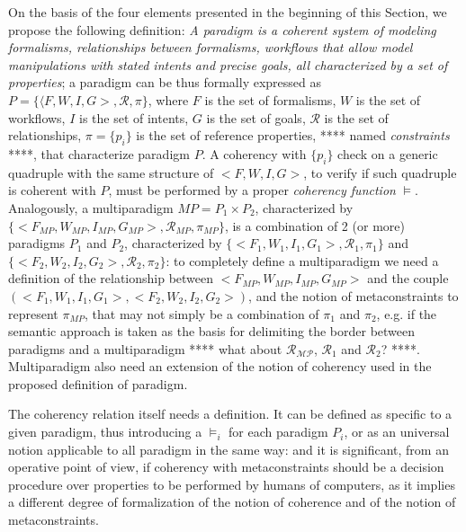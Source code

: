 On the basis of the four elements presented in the beginning of this Section, we propose the following definition: \textit{A paradigm is a coherent system of modeling formalisms, relationships between formalisms, workflows that allow model manipulations with stated intents and precise goals, all characterized by a set of properties}; a paradigm can be thus formally expressed as $P=\{\langle F,W,I,G>, \mathcal{R}, \pi \}$, where $F$ is the set of formalisms, $W$ is the set of workflows, $I$ is the set of intents, $G$ is the set of goals, $\mathcal{R}$ is the set of relationships, $\pi =\{p_i\}$ is the set of reference properties, **** named \textit{constraints} ****, that characterize paradigm $P$. A coherency with $\{p_i\}$ check on a generic quadruple with the same structure of $<F,W,I,G>$, to verify if such quadruple is coherent with $P$, must be performed by a proper \textit{coherency function} $\models$. Analogously, a multiparadigm $MP=P_1 \times P_2$, characterized by $\{<F_\mathit{MP},W_{MP},I_{MP},G_{MP}>, \mathcal{R}_{MP}, \pi_{MP}\}$, is a combination of 2 (or more) paradigms $P_1$ and $P_2$, characterized by $\{< F_1,W_1,I_1,G_1>, \mathcal{R}_1 , \pi_1\}$ and $\{<F_2,W_2,I_2,G_2>, \mathcal{R}_2, \pi_2\}$: to completely define a multiparadigm we need a definition of the relationship between $<F_{MP},W_{MP},I_{MP},G_{MP}>$ and the couple $(< F_1,W_1,I_1,G_1>,<F_2,W_2,I_2,G_2>)$, and the notion of metaconstraints to represent $\pi_{MP}$, that may not simply be a combination of $\pi_1$ and $\pi_2$, e.g. if the semantic approach is taken as the basis for delimiting the border between paradigms and a multiparadigm **** what about $\mathcal{R_{MP}}$, $\mathcal{R}_1$ and $\mathcal{R}_2$? ****. Multiparadigm also need an extension of the notion of coherency used in the proposed definition of paradigm.

The coherency relation itself needs a definition. It can be defined as specific to a given paradigm, thus introducing a $\models_i$ for each paradigm $P_i$, or as an universal notion applicable to all paradigm in the same way: and it is significant, from an operative point of view, if coherency with metaconstraints should be a decision procedure over properties to be performed by humans of computers, as it implies a different degree of formalization of the notion of coherence and of the notion of metaconstraints.
